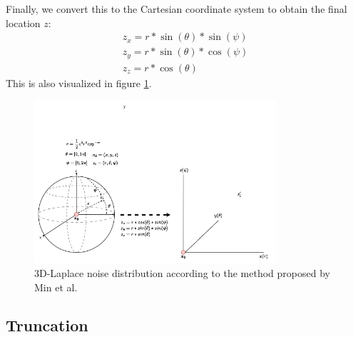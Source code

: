 Finally, we convert this to the Cartesian coordinate system to obtain the final location $z$:
\begin{align*}
  z_x = r * \sin(\theta) * \sin(\psi) \\
  z_y = r * \sin(\theta) * \cos(\psi) \\
  z_z = r * \cos(\theta)
\end{align*}
This is also visualized in figure \ref{fig:3d-laplace}.
\begin{figure}
  \includegraphics[width=0.8\textwidth]{TheorethicalFramework/ND-Laplace/Images/3d_laplace.png}
  \caption{3D-Laplace noise distribution according to the method proposed by Min et al. \citep{9646489}}
  \label{fig:3d-laplace}
\end{figure}
\subsection{Truncation}
